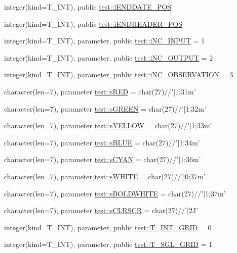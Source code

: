 \begin{DoxyCompactItemize}
\item 
integer(kind=T\_\-INT), public \hyperlink{namespacetest_af29dc757927589439e32db648cb927b9}{test::iENDDATE\_\-POS}
\item 
integer(kind=T\_\-INT), public \hyperlink{namespacetest_ae27eee462dde556ad327a954598ee9de}{test::iENDHEADER\_\-POS}
\item 
integer(kind=T\_\-INT), parameter, public \hyperlink{namespacetest_a47a3dcd6434015912debe4d7c32a6696}{test::iNC\_\-INPUT} = 1
\item 
integer(kind=T\_\-INT), parameter, public \hyperlink{namespacetest_a0201f90a40599962ba9f170b55b2940b}{test::iNC\_\-OUTPUT} = 2
\item 
integer(kind=T\_\-INT), parameter, public \hyperlink{namespacetest_a6a723368a0f10bdf178fcec29f827e5d}{test::iNC\_\-OBSERVATION} = 3
\item 
character(len=7), parameter \hyperlink{namespacetest_ad68d7758d8be0c0e11554d320e7fe361}{test::sRED} = char(27)//'\mbox{[}1;31m'
\item 
character(len=7), parameter \hyperlink{namespacetest_a51f6a60bb17f75fd328f4ebec7c8fdc9}{test::sGREEN} = char(27)//'\mbox{[}1;32m'
\item 
character(len=7), parameter \hyperlink{namespacetest_ae3efae673a64050b6961fb4a43eafe2f}{test::sYELLOW} = char(27)//'\mbox{[}1;33m'
\item 
character(len=7), parameter \hyperlink{namespacetest_a67805434e80e529c4296afa41874d705}{test::sBLUE} = char(27)//'\mbox{[}1;34m'
\item 
character(len=7), parameter \hyperlink{namespacetest_adc949307b4c1c64ca9c4680cb1772584}{test::sCYAN} = char(27)//'\mbox{[}1;36m'
\item 
character(len=7), parameter \hyperlink{namespacetest_adda4462ac95858ee3e499e1f721f4cb9}{test::sWHITE} = char(27)//'\mbox{[}0;37m'
\item 
character(len=7), parameter \hyperlink{namespacetest_a30a237c02c2640389d102030736a9a64}{test::sBOLDWHITE} = char(27)//'\mbox{[}1;37m'
\item 
character(len=7), parameter \hyperlink{namespacetest_a9400b0462b1b2636c59786f754d01c32}{test::sCLRSCR} = char(27)//'\mbox{[}2J'
\item 
integer(kind=T\_\-INT), parameter, public \hyperlink{namespacetest_a6b23ea23fb5d02c95f52b7d39ab348fe}{test::T\_\-INT\_\-GRID} = 0
\item 
integer(kind=T\_\-INT), parameter, public \hyperlink{namespacetest_a60ae6ddfc7d411862eddaea30f59049f}{test::T\_\-SGL\_\-GRID} = 1

\end{DoxyCompactItemize}
